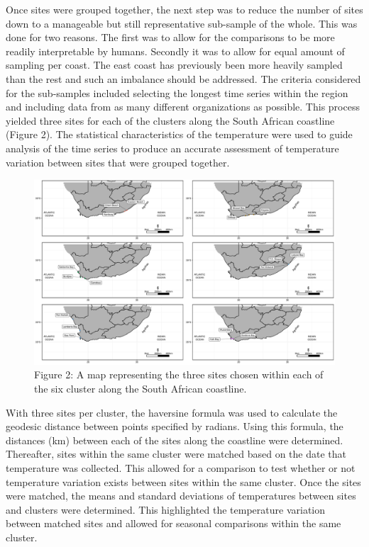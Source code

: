 \documentclass[12pt,A4paper,]{article}
\begin{document}
Once sites were grouped together, the next step was to reduce the number
of sites down to a manageable but still representative sub-sample of the
whole. This was done for two reasons. The first was to allow for the
comparisons to be more readily interpretable by humans. Secondly it was
to allow for equal amount of sampling per coast. The east coast has
previously been more heavily sampled than the rest and such an imbalance
should be addressed. The criteria considered for the sub-samples
included selecting the longest time series within the region and
including data from as many different organizations as possible. This
process yielded three sites for each of the clusters along the South
African coastline (Figure 2). The statistical characteristics of the
temperature were used to guide analysis of the time series to produce an
accurate assessment of temperature variation between sites that were
grouped together.

\begin{figure}
\centering
\includegraphics{../figures/final_combined_plot.pdf}
\caption{Figure 2: A map representing the three sites chosen within each
of the six cluster along the South African coastline.}
\end{figure}

With three sites per cluster, the haversine formula was used to
calculate the geodesic distance between points specified by radians.
Using this formula, the distances (km) between each of the sites along
the coastline were determined. Thereafter, sites within the same cluster
were matched based on the date that temperature was collected. This
allowed for a comparison to test whether or not temperature variation
exists between sites within the same cluster. Once the sites were
matched, the means and standard deviations of temperatures between sites
and clusters were determined. This highlighted the temperature variation
between matched sites and allowed for seasonal comparisons within the
same cluster.
\end{document}
